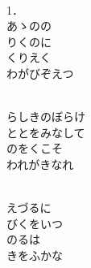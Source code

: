 \documentclass[10pt,b5j]{tarticle} %
\begin{document}
\vspace{1.5em} %
\newcommand{\linespace}{0.5em} %
\newcommand{\blocksize}{0.5\hsize} %
\newcommand{\itemmargin}{3em} %
\begin{enumerate} %
    \setlength{\itemindent}{\itemmargin} %
    \begin{minipage}[c]{\blocksize}
    
        \vspace{\linespace}
        \item~\\
        1．\\
        あゝのの\\
        りくのに\\
        くりえく\\
        わがびぞえつ
        
    \end{minipage}
    \begin{minipage}[c]{\blocksize}
        
        \vspace{\linespace}
        \item~\\
        らしきのぼらけ\\
        ととをみなして\\
        のをくこそ\\
        われがきなれ
        
    \end{minipage}
    \begin{minipage}[c]{\blocksize}
        
        \vspace{\linespace}
        \item~\\
        えづるに\\
        びくをいつ\\
        のるは\\
        きをふかな
        

\end{minipage}
\end{enumerate}
\end{document}
